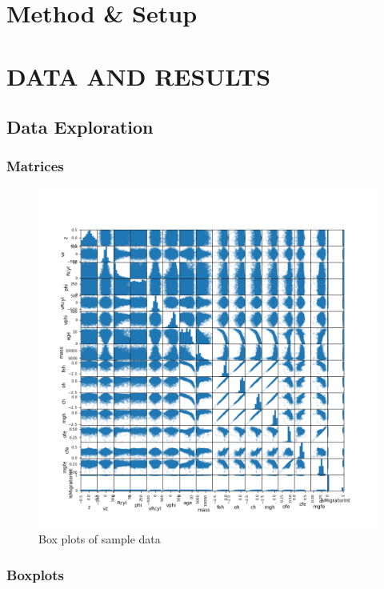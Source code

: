 \documentclass[%
 aapm,
 mph,%
 amsmath,amssymb,
 reprint,%
]{revtex4-2}
\begin{document}
\section{\label{sec_level1}Method \& Setup}


\section{DATA AND RESULTS}
\subsection{\label{sec:datasxploration}Data Exploration}
\subsubsection{\label{sec:Matrices}Matrices}


\begin{figure}[h!]
    \centering
    \includegraphics[width=\columnwidth]{Plots/scatter_matrix.png}
    \caption{Box plots of sample data}
    \label{fig:boxplots}
\end{figure}


\subsubsection{\label{sec:boxplots}Boxplots}

\end{document}
